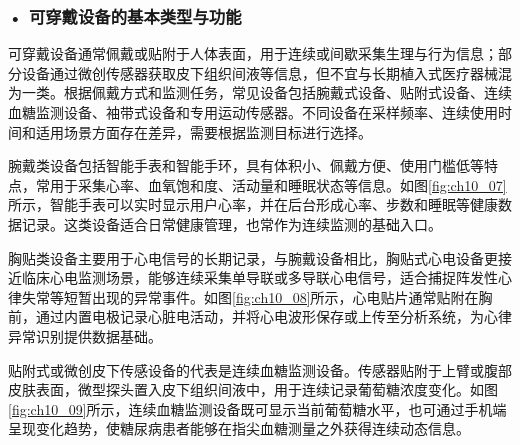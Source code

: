 \subsubsection*{\textbf{• 可穿戴设备的基本类型与功能}}

可穿戴设备通常佩戴或贴附于人体表面，用于连续或间歇采集生理与行为信息；部分设备通过微创传感器获取皮下组织间液等信息，但不宜与长期植入式医疗器械混为一类。根据佩戴方式和监测任务，常见设备包括腕戴式设备、贴附式设备、连续血糖监测设备、袖带式设备和专用运动传感器。不同设备在采样频率、连续使用时间和适用场景方面存在差异，需要根据监测目标进行选择。

腕戴类设备包括智能手表和智能手环，具有体积小、佩戴方便、使用门槛低等特点，常用于采集心率、血氧饱和度、活动量和睡眠状态等信息。如图\ref{fig:ch10_07}所示，智能手表可以实时显示用户心率，并在后台形成心率、步数和睡眠等健康数据记录。这类设备适合日常健康管理，也常作为连续监测的基础入口。
\par\medskip
\begin{center}
\begin{minipage}{0.82\textwidth}
\centering
{}
\label{fig:ch10_07}
\end{minipage}
\end{center}
\par\medskip
胸贴类设备主要用于心电信号的长期记录，与腕戴设备相比，胸贴式心电设备更接近临床心电监测场景，能够连续采集单导联或多导联心电信号，适合捕捉阵发性心律失常等短暂出现的异常事件。如图\ref{fig:ch10_08}所示，心电贴片通常贴附在胸前，通过内置电极记录心脏电活动，并将心电波形保存或上传至分析系统，为心律异常识别提供数据基础。

\par\medskip
\begin{center}
\begin{minipage}{0.82\textwidth}
\centering
{}
\label{fig:ch10_08}
\end{minipage}
\end{center}
\par\medskip

贴附式或微创皮下传感设备的代表是连续血糖监测设备。传感器贴附于上臂或腹部皮肤表面，微型探头置入皮下组织间液中，用于连续记录葡萄糖浓度变化。如图\ref{fig:ch10_09}所示，连续血糖监测设备既可显示当前葡萄糖水平，也可通过手机端呈现变化趋势，使糖尿病患者能够在指尖血糖测量之外获得连续动态信息。
\par\medskip
\begin{center}
\begin{minipage}{0.82\textwidth}
\centering
{}
\label{fig:ch10_09}
\end{minipage}
\end{center}
\par\medskip

